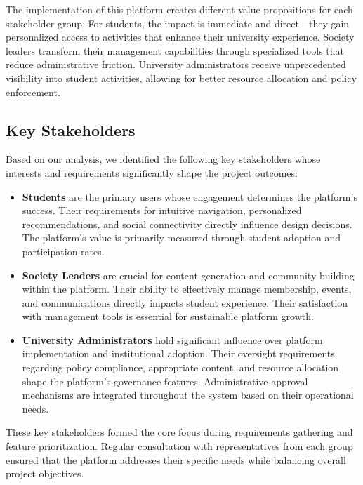 The implementation of this platform creates different value propositions for each stakeholder group. For students, the impact is immediate and direct—they gain personalized access to activities that enhance their university experience. Society leaders transform their management capabilities through specialized tools that reduce administrative friction. University administrators receive unprecedented visibility into student activities, allowing for better resource allocation and policy enforcement.

\subsection{Key Stakeholders}

Based on our analysis, we identified the following key stakeholders whose interests and requirements significantly shape the project outcomes:

\begin{itemize}
    \item \textbf{Students} are the primary users whose engagement determines the platform's success. Their requirements for intuitive navigation, personalized recommendations, and social connectivity directly influence design decisions. The platform's value is primarily measured through student adoption and participation rates.
    
    \item \textbf{Society Leaders} are crucial for content generation and community building within the platform. Their ability to effectively manage membership, events, and communications directly impacts student experience. Their satisfaction with management tools is essential for sustainable platform growth.
    
    \item \textbf{University Administrators} hold significant influence over platform implementation and institutional adoption. Their oversight requirements regarding policy compliance, appropriate content, and resource allocation shape the platform's governance features. Administrative approval mechanisms are integrated throughout the system based on their operational needs.
\end{itemize}

These key stakeholders formed the core focus during requirements gathering and feature prioritization. Regular consultation with representatives from each group ensured that the platform addresses their specific needs while balancing overall project objectives.